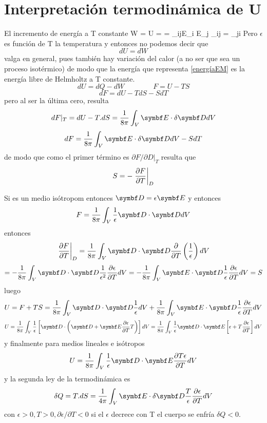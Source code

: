 \documentclass[10pt,oneside]{CBFT_book}
\begin{document}
\section{Interpretación termodinámica de U}

El incremento de energía a T constante
\be
	\delta W = U =  \cdot{} =  \epsilon_{ij}E_i E_j	\qquad
	 \; \epsilon_{ij} = \epsilon_{ji} \; 
	\label{energíaEM}
\ee
Pero $\epsilon$ es función de T la temperatura y entonces no podemos decir que
\[
	dU = dW
\]
valga en general, pues también hay variación del calor (a no ser que sea un proceso isotérmico) de modo que 
la energía que representa \eqref{energíaEM} es la energía libre de Helmholtz a T constante.
\[
	dU = dQ - dW \qquad \qquad F = U - TS
\]
\[
	dF = dU - TdS - SdT
\]
pero al ser la última cero, resulta
\[
	dF|_T = dU - T.dS = \frac{1}{8\pi} \int_V \vb{E}\cdot\delta\vb{D} dV
\]
\[
	dF = \frac{1}{8\pi} \int_V \vb{E}\cdot\delta\vb{D} dV - SdT
\]
de modo que como el primer término es $\partial F / \partial D |_T$ resulta que 
\[
	S = -\left.\frac{\partial^{\hspace{-0.05em}} {F}}{\partial {T}^{\hspace{-0.05em}}}\right|_D
\]

Si es un medio isótropom entonces $\vb{D} = \epsilon \vb{E}$ y entonces 
\[
	F = \frac{1}{8\pi} \int_V \frac{1}{\epsilon}\vb{D}\cdot\vb{D} dV
\]
entonces
\[
	\left.\dpar{F}{T}\right|_D	= \frac{1}{8\pi} \int_V \vb{D}\cdot\vb{D} \frac{\partial}{\partial T}
		\left( \frac{1}{\epsilon} \right) dV
\]
\[
	=  - \frac{1}{8\pi} \int_V \vb{D}\cdot\vb{D} \frac{1}{\epsilon^2} \dpar{\epsilon}{T}  dV =
	-\frac{1}{8\pi} \int_V \vb{E}\cdot\vb{D} \frac{1}{\epsilon} \dpar{\epsilon}{T}  dV = S
\]
luego 
\[
	U = F + TS = \frac{1}{8\pi} \int_V \vb{D}\cdot\vb{D} \frac{1}{\epsilon} dV  +
	\frac{1}{8\pi} \int_V \vb{E}\cdot\vb{D} \frac{1}{\epsilon} \dpar{\epsilon}{T}  dV 
\]
\[
	U = \frac{1}{8\pi} \int_V \frac{1}{\epsilon} \left[ \vb{D}\cdot \left( \vb{D} + 
		\vb{E} \dpar{\epsilon}{T} T \right) \right] dV  = \frac{1}{8\pi} \int_V \frac{1}{\epsilon}
		\vb{D}\cdot \vb{E} \left[ \epsilon + T \dpar{\epsilon}{T}  \right] dV
\]
y finalmente para medios lineales e isótropos
\[
	U = \frac{1}{8\pi} \int_V \frac{1}{\epsilon} \vb{D}\cdot \vb{E} \dpar{ T \epsilon}{T} dV
\]
y la segunda ley de la termodinámica es
\[
	\delta Q = T.dS = \frac{1}{4\pi} \int_V \vb{E}\cdot\delta\vb{D} \frac{T}{\epsilon}
	\dpar{\epsilon}{T} dV
\]
con $\epsilon > 0, T > 0, \partial \epsilon / \partial T < 0$ si el $\epsilon$ decrece con T el cuerpo
se enfría $\delta Q < 0$.
\end{document}
